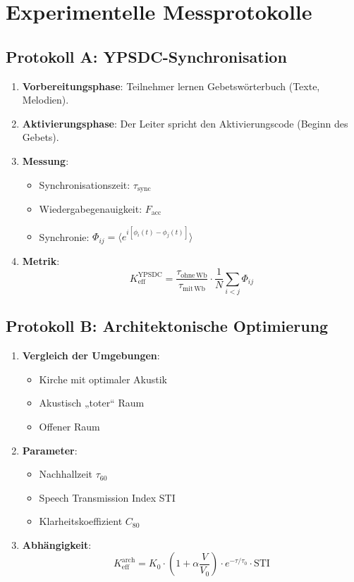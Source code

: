 \documentclass[12pt,a4paper]{article}
\begin{document}
	\section{Experimentelle Messprotokolle}
	
	\subsection{Protokoll A: YPSDC-Synchronisation}
	
	\begin{enumerate}
		\item \textbf{Vorbereitungsphase}: Teilnehmer lernen Gebetswörterbuch (Texte, Melodien).
		\item \textbf{Aktivierungsphase}: Der Leiter spricht den Aktivierungscode (Beginn des Gebets).
		\item \textbf{Messung}:
		\begin{itemize}
			\item Synchronisationszeit: $\tau_{\mathrm{sync}}$
			\item Wiedergabegenauigkeit: $F_{\mathrm{acc}}$
			\item Synchronie: $\Phi_{ij} = \langle e^{i[\phi_i(t) - \phi_j(t)]} \rangle$
		\end{itemize}
		\item \textbf{Metrik}:
		\[
		K_{\mathrm{eff}}^{\mathrm{YPSDC}} = \frac{\tau_{\mathrm{ohne\,Wb}}}{\tau_{\mathrm{mit\,Wb}}} \cdot \frac{1}{N} \sum_{i<j} \Phi_{ij}
		\]
	\end{enumerate}
	
	\subsection{Protokoll B: Architektonische Optimierung}
	
	\begin{enumerate}
		\item \textbf{Vergleich der Umgebungen}:
		\begin{itemize}
			\item Kirche mit optimaler Akustik
			\item Akustisch „toter“ Raum
			\item Offener Raum
		\end{itemize}
		\item \textbf{Parameter}:
		\begin{itemize}
			\item Nachhallzeit $\tau_{60}$
			\item Speech Transmission Index STI
			\item Klarheitskoeffizient $C_{80}$
		\end{itemize}
		\item \textbf{Abhängigkeit}:
		\[
		K_{\mathrm{eff}}^{\mathrm{arch}} = K_0 \cdot \left(1 + \alpha \frac{V}{V_0}\right) \cdot e^{-\tau/\tau_0} \cdot \mathrm{STI}
		\]
	\end{enumerate}
	
\end{document}
